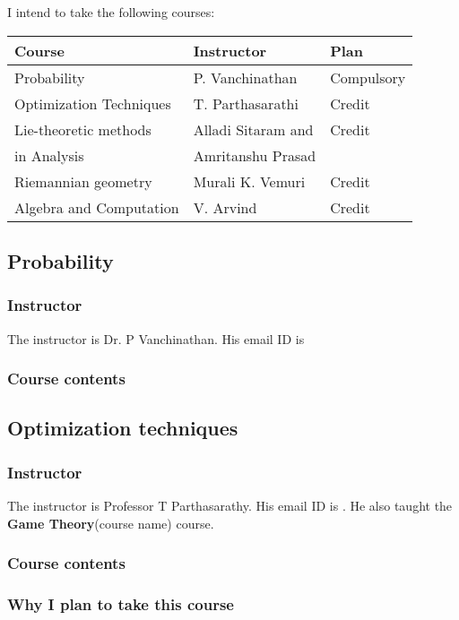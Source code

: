\documentclass[a4paper]{amsart}
\newcommand{\coursename}[1]{{\bf #1}{\small{(course name)}}}
\begin{document}
I intend to take the following courses:

\begin{tabular}{|l|l|l|}
  \hline
  Course & Instructor & Plan\\
  \hline
  Probability & P. Vanchinathan & Compulsory\\
  Optimization Techniques & T. Parthasarathi & Credit\\
  Lie-theoretic methods & Alladi Sitaram and & Credit\\
  in Analysis & Amritanshu Prasad & \\
  Riemannian geometry & Murali K. Vemuri & Credit\\
  Algebra and Computation & V. Arvind & Credit\\
  \hline
\end{tabular}

\subsection{Probability}

\subsubsection{Instructor}

The instructor is Dr. P Vanchinathan. His email ID is 

\subsubsection{Course contents}

\subsection{Optimization techniques}

\subsubsection{Instructor}

The instructor is Professor T Parthasarathy. His email ID is .
He also taught the \coursename{Game Theory} course.

\subsubsection{Course contents}

\subsubsection{Why I plan to take this course}
\end{document}

